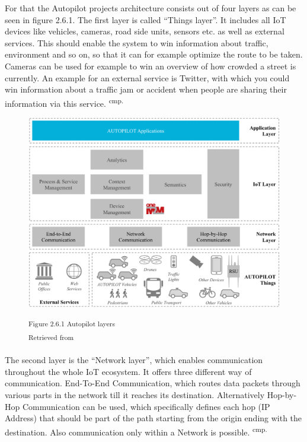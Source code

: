 For that the Autopilot projects architecture consists out of four layers as can be seen in figure 2.6.1. The first layer is called ``Things layer''. It includes all IoT devices like vehicles, cameras, road side units, sensors etc. as well as external services. This should enable the system to win information about traffic, environment and so on, so that it can for example optimize the route to be taken. Cameras can be used for example to win an overview of how crowded a street is currently. An example for an external service is Twitter, with which you could win information about a traffic jam or accident when people are sharing their information via this service. \textsuperscript{cmp.\cite{5}}

\begin{figure}[h]
\centering
\includegraphics[width=\textwidth/5*4]{images/autopilot_layers.png}

\textsuperscript{Figure 2.6.1 Autopilot layers}\\
\textsuperscript{Retrieved from \cite{5}}
\end{figure}

The second layer is the ``Network layer'', which enables communication throughout the whole IoT ecosystem. It offers three different way of communication. End-To-End Communication, which routes data packets through various parts in the network till it reaches its destination. Alternatively Hop-by-Hop Communication can be used, which specifically defines each hop (IP Address) that should be part of the path starting from the origin ending with the destination. Also communication only within a Network is possible. \textsuperscript{cmp.\cite{5}}


